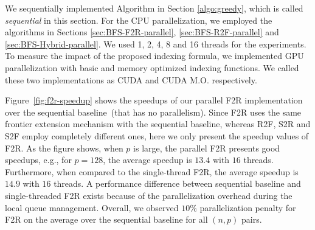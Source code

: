 \documentclass[12pt]{article}
\newcommand{\kkcomm}[1]{{\color{red}{\bf kk: #1}}}
\newcommand{\comment}[2]{{\color{red}{\bf (#1: #2)}}}
\begin{document}
We sequentially implemented Algorithm in Section \ref{algo:greedy}, which is called {\it sequential} in this section. For the CPU parallelization, we employed the algorithms in Sections \ref{sec:BFS-F2R-parallel}, \ref{sec:BFS-R2F-parallel} and \ref{sec:BFS-Hybrid-parallel}. We used 1, 2, 4, 8 and 16 threads for the experiments. To measure the impact of the proposed indexing formula, we implemented GPU parallelization with basic and memory optimized indexing functions. We called these two implementations as CUDA and CUDA M.O. respectively.

Figure~\ref{fig:f2r-speedup} shows the speedups of our parallel F2R implementation over the sequential baseline~(that has no parallelism). Since F2R uses the same frontier extension mechanism with the sequential baseline, whereas R2F, S2R and S2F employ completely different ones, here we only present the speedup values of F2R. As the figure shows, when $p$ is large, the parallel F2R presents good speedups, e.g., for $p = 128$, the average speedup is $13.4$ with $16$ threads. Furthermore, when compared to the single-thread F2R, the average speedup is $14.9$ with $16$ threads. A performance difference between sequential baseline and single-threaded F2R exists because of the parallelization overhead during the local queue management. Overall, we observed $10\%$ parallelization penalty for F2R on the average over the sequential baseline for all $(n, p)$ pairs. \comment{sertac}{penalty hesaplarken sadece 1 threadle mi karsilastirmak lazim?} \kkcomm{bu cok sorun degil. boyle olabilir.}
\end{document}

